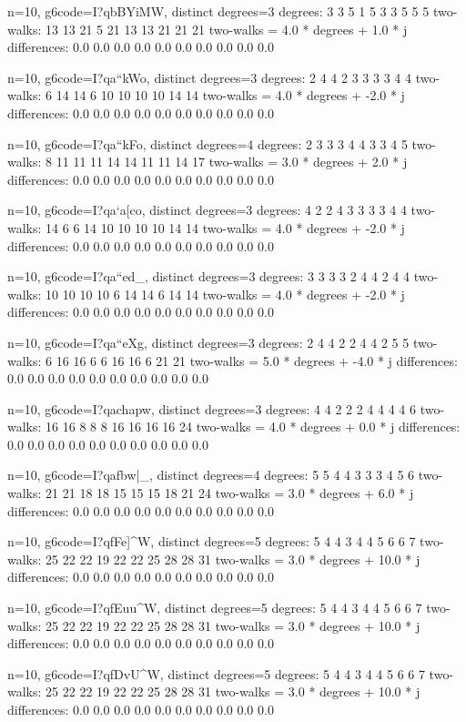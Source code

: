 {{{{{{{{{{n=10, g6code=I?qbBYiMW, distinct degrees=3
degrees: 3 3 5 1 5 3 3 5 5 5 
two-walks: 13 13 21 5 21 13 13 21 21 21 
two-walks = 4.0 * degrees + 1.0 * j
differences: 0.0 0.0 0.0 0.0 0.0 0.0 0.0 0.0 0.0 0.0 

n=10, g6code=I?qa``kWo, distinct degrees=3
degrees: 2 4 4 2 3 3 3 3 4 4 
two-walks: 6 14 14 6 10 10 10 10 14 14 
two-walks = 4.0 * degrees + -2.0 * j
differences: 0.0 0.0 0.0 0.0 0.0 0.0 0.0 0.0 0.0 0.0 

n=10, g6code=I?qa``kFo, distinct degrees=4
degrees: 2 3 3 3 4 4 3 3 4 5 
two-walks: 8 11 11 11 14 14 11 11 14 17 
two-walks = 3.0 * degrees + 2.0 * j
differences: 0.0 0.0 0.0 0.0 0.0 0.0 0.0 0.0 0.0 0.0 

n=10, g6code=I?qa`a[co, distinct degrees=3
degrees: 4 2 2 4 3 3 3 3 4 4 
two-walks: 14 6 6 14 10 10 10 10 14 14 
two-walks = 4.0 * degrees + -2.0 * j
differences: 0.0 0.0 0.0 0.0 0.0 0.0 0.0 0.0 0.0 0.0 

n=10, g6code=I?qa``ed_, distinct degrees=3
degrees: 3 3 3 3 2 4 4 2 4 4 
two-walks: 10 10 10 10 6 14 14 6 14 14 
two-walks = 4.0 * degrees + -2.0 * j
differences: 0.0 0.0 0.0 0.0 0.0 0.0 0.0 0.0 0.0 0.0 

n=10, g6code=I?qa``eXg, distinct degrees=3
degrees: 2 4 4 2 2 4 4 2 5 5 
two-walks: 6 16 16 6 6 16 16 6 21 21 
two-walks = 5.0 * degrees + -4.0 * j
differences: 0.0 0.0 0.0 0.0 0.0 0.0 0.0 0.0 0.0 0.0 

n=10, g6code=I?qachapw, distinct degrees=3
degrees: 4 4 2 2 2 4 4 4 4 6 
two-walks: 16 16 8 8 8 16 16 16 16 24 
two-walks = 4.0 * degrees + 0.0 * j
differences: 0.0 0.0 0.0 0.0 0.0 0.0 0.0 0.0 0.0 0.0 

n=10, g6code=I?qafbw|_, distinct degrees=4
degrees: 5 5 4 4 3 3 3 4 5 6 
two-walks: 21 21 18 18 15 15 15 18 21 24 
two-walks = 3.0 * degrees + 6.0 * j
differences: 0.0 0.0 0.0 0.0 0.0 0.0 0.0 0.0 0.0 0.0 

n=10, g6code=I?qfFe]^W, distinct degrees=5
degrees: 5 4 4 3 4 4 5 6 6 7 
two-walks: 25 22 22 19 22 22 25 28 28 31 
two-walks = 3.0 * degrees + 10.0 * j
differences: 0.0 0.0 0.0 0.0 0.0 0.0 0.0 0.0 0.0 0.0 

n=10, g6code=I?qfEuu^W, distinct degrees=5
degrees: 5 4 4 3 4 4 5 6 6 7 
two-walks: 25 22 22 19 22 22 25 28 28 31 
two-walks = 3.0 * degrees + 10.0 * j
differences: 0.0 0.0 0.0 0.0 0.0 0.0 0.0 0.0 0.0 0.0 

n=10, g6code=I?qfDvU^W, distinct degrees=5
degrees: 5 4 4 3 4 4 5 6 6 7 
two-walks: 25 22 22 19 22 22 25 28 28 31 
two-walks = 3.0 * degrees + 10.0 * j
differences: 0.0 0.0 0.0 0.0 0.0 0.0 0.0 0.0 0.0 0.0 

}}}}}}}}}}
